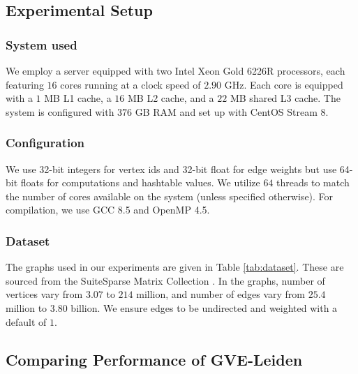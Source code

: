 \subsection{Experimental Setup}
\label{sec:setup}

\subsubsection{System used}

We employ a server equipped with two Intel Xeon Gold 6226R processors, each featuring $16$ cores running at a clock speed of $2.90$ GHz. Each core is equipped with a $1$ MB L1 cache, a $16$ MB L2 cache, and a $22$ MB shared L3 cache. The system is configured with $376$ GB RAM and set up with CentOS Stream 8.


\subsubsection{Configuration}

We use 32-bit integers for vertex ids and 32-bit float for edge weights but use 64-bit floats for computations and hashtable values. We utilize $64$ threads to match the number of cores available on the system (unless specified otherwise). For compilation, we use GCC 8.5 and OpenMP 4.5.


\subsubsection{Dataset}

The graphs used in our experiments are given in Table \ref{tab:dataset}. These are sourced from the SuiteSparse Matrix Collection \cite{suite19}. In the graphs, number of vertices vary from $3.07$ to $214$ million, and number of edges vary from $25.4$ million to $3.80$ billion. We ensure edges to be undirected and weighted with a default of $1$.








\subsection{Comparing Performance of GVE-Leiden}

